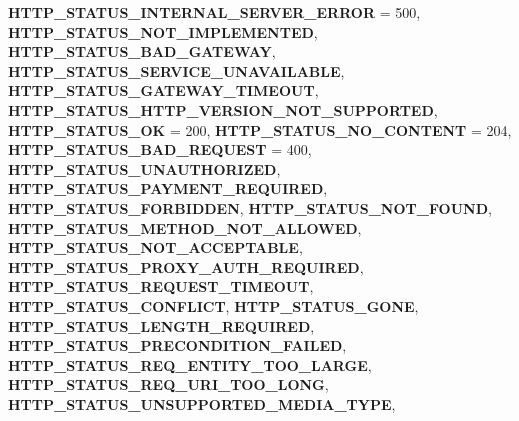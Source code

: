 \begin{DoxyCompactItemize}
\newline
{\bfseries H\+T\+T\+P\+\_\+\+S\+T\+A\+T\+U\+S\+\_\+\+I\+N\+T\+E\+R\+N\+A\+L\+\_\+\+S\+E\+R\+V\+E\+R\+\_\+\+E\+R\+R\+OR} = 500, 
{\bfseries H\+T\+T\+P\+\_\+\+S\+T\+A\+T\+U\+S\+\_\+\+N\+O\+T\+\_\+\+I\+M\+P\+L\+E\+M\+E\+N\+T\+ED}, 
{\bfseries H\+T\+T\+P\+\_\+\+S\+T\+A\+T\+U\+S\+\_\+\+B\+A\+D\+\_\+\+G\+A\+T\+E\+W\+AY}, 
{\bfseries H\+T\+T\+P\+\_\+\+S\+T\+A\+T\+U\+S\+\_\+\+S\+E\+R\+V\+I\+C\+E\+\_\+\+U\+N\+A\+V\+A\+I\+L\+A\+B\+LE}, 
\newline
{\bfseries H\+T\+T\+P\+\_\+\+S\+T\+A\+T\+U\+S\+\_\+\+G\+A\+T\+E\+W\+A\+Y\+\_\+\+T\+I\+M\+E\+O\+UT}, 
{\bfseries H\+T\+T\+P\+\_\+\+S\+T\+A\+T\+U\+S\+\_\+\+H\+T\+T\+P\+\_\+\+V\+E\+R\+S\+I\+O\+N\+\_\+\+N\+O\+T\+\_\+\+S\+U\+P\+P\+O\+R\+T\+ED}, 
{\bfseries H\+T\+T\+P\+\_\+\+S\+T\+A\+T\+U\+S\+\_\+\+OK} = 200, 
{\bfseries H\+T\+T\+P\+\_\+\+S\+T\+A\+T\+U\+S\+\_\+\+N\+O\+\_\+\+C\+O\+N\+T\+E\+NT} = 204, 
\newline
{\bfseries H\+T\+T\+P\+\_\+\+S\+T\+A\+T\+U\+S\+\_\+\+B\+A\+D\+\_\+\+R\+E\+Q\+U\+E\+ST} = 400, 
{\bfseries H\+T\+T\+P\+\_\+\+S\+T\+A\+T\+U\+S\+\_\+\+U\+N\+A\+U\+T\+H\+O\+R\+I\+Z\+ED}, 
{\bfseries H\+T\+T\+P\+\_\+\+S\+T\+A\+T\+U\+S\+\_\+\+P\+A\+Y\+M\+E\+N\+T\+\_\+\+R\+E\+Q\+U\+I\+R\+ED}, 
{\bfseries H\+T\+T\+P\+\_\+\+S\+T\+A\+T\+U\+S\+\_\+\+F\+O\+R\+B\+I\+D\+D\+EN}, 
\newline
{\bfseries H\+T\+T\+P\+\_\+\+S\+T\+A\+T\+U\+S\+\_\+\+N\+O\+T\+\_\+\+F\+O\+U\+ND}, 
{\bfseries H\+T\+T\+P\+\_\+\+S\+T\+A\+T\+U\+S\+\_\+\+M\+E\+T\+H\+O\+D\+\_\+\+N\+O\+T\+\_\+\+A\+L\+L\+O\+W\+ED}, 
{\bfseries H\+T\+T\+P\+\_\+\+S\+T\+A\+T\+U\+S\+\_\+\+N\+O\+T\+\_\+\+A\+C\+C\+E\+P\+T\+A\+B\+LE}, 
{\bfseries H\+T\+T\+P\+\_\+\+S\+T\+A\+T\+U\+S\+\_\+\+P\+R\+O\+X\+Y\+\_\+\+A\+U\+T\+H\+\_\+\+R\+E\+Q\+U\+I\+R\+ED}, 
\newline
{\bfseries H\+T\+T\+P\+\_\+\+S\+T\+A\+T\+U\+S\+\_\+\+R\+E\+Q\+U\+E\+S\+T\+\_\+\+T\+I\+M\+E\+O\+UT}, 
{\bfseries H\+T\+T\+P\+\_\+\+S\+T\+A\+T\+U\+S\+\_\+\+C\+O\+N\+F\+L\+I\+CT}, 
{\bfseries H\+T\+T\+P\+\_\+\+S\+T\+A\+T\+U\+S\+\_\+\+G\+O\+NE}, 
{\bfseries H\+T\+T\+P\+\_\+\+S\+T\+A\+T\+U\+S\+\_\+\+L\+E\+N\+G\+T\+H\+\_\+\+R\+E\+Q\+U\+I\+R\+ED}, 
\newline
{\bfseries H\+T\+T\+P\+\_\+\+S\+T\+A\+T\+U\+S\+\_\+\+P\+R\+E\+C\+O\+N\+D\+I\+T\+I\+O\+N\+\_\+\+F\+A\+I\+L\+ED}, 
{\bfseries H\+T\+T\+P\+\_\+\+S\+T\+A\+T\+U\+S\+\_\+\+R\+E\+Q\+\_\+\+E\+N\+T\+I\+T\+Y\+\_\+\+T\+O\+O\+\_\+\+L\+A\+R\+GE}, 
{\bfseries H\+T\+T\+P\+\_\+\+S\+T\+A\+T\+U\+S\+\_\+\+R\+E\+Q\+\_\+\+U\+R\+I\+\_\+\+T\+O\+O\+\_\+\+L\+O\+NG}, 
{\bfseries H\+T\+T\+P\+\_\+\+S\+T\+A\+T\+U\+S\+\_\+\+U\+N\+S\+U\+P\+P\+O\+R\+T\+E\+D\+\_\+\+M\+E\+D\+I\+A\+\_\+\+T\+Y\+PE}, 

\end{DoxyCompactItemize}
